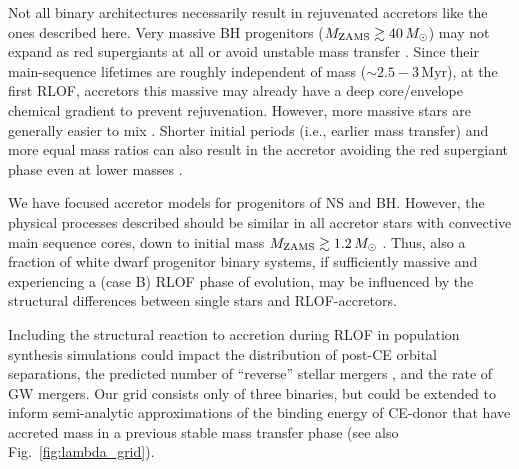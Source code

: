 \documentclass[twocolumn,twocolappendix,trackchanges]{aastex63}
\DeclareRobustCommand{\Figref}[1]{Fig.~\ref{#1}}
\begin{document}
Not all binary architectures necessarily result in rejuvenated
accretors like the ones described here. Very massive BH progenitors
($M_{\rm ZAMS}\gtrsim 40\,M_\odot$) may not expand as red supergiants
at all or avoid unstable mass transfer \citep[e.g.,][]{vanson:2021,
  marchant:2021}. Since their main-sequence lifetimes are roughly
independent of mass ($\sim{}2.5-3$\,Myr), at the first RLOF, accretors
this massive may already have a deep core/envelope chemical gradient
to prevent rejuvenation. %
However,
more massive stars are generally easier to mix \citep[including
reaching rotationally-induced chemically homogeneous evolution,
e.g.,][]{yoon:2005, demink:2016}. Shorter initial periods (i.e.,
earlier mass transfer) and more equal mass ratios can also result in
the accretor avoiding the red supergiant phase even at lower masses
\citep{cantiello:2007}.

We have focused accretor models for progenitors of NS and BH. However,
the physical processes described should be similar in all accretor
stars with convective main sequence cores, down to initial mass
$M_{\rm ZAMS}\gtrsim 1.2\,M_\odot$ \citep[see also][]{wang:20}. Thus,
also a fraction of white dwarf progenitor binary systems, if
sufficiently massive and experiencing a (case B) RLOF phase of
evolution, may be influenced by the structural differences between
single stars and RLOF-accretors.

Including the structural reaction to accretion during RLOF in
population synthesis simulations could impact the distribution of
post-CE orbital separations, the predicted number of ``reverse''
stellar mergers \citep[e.g.,][]{zapartas:2017}, and the rate of GW
mergers. Our grid consists only of three binaries, but could be
extended to inform semi-analytic approximations of the binding energy
of CE-donor that have accreted mass in a previous stable mass transfer
phase (see also \Figref{fig:lambda_grid}).

\end{document}

